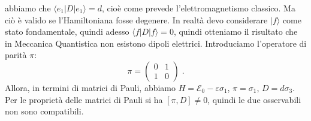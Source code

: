 \documentclass[10pt,a4paper]{report}
\theoremstyle{definition}
\numberwithin{equation}{section}
\newcommand{\bra}{\langle}
\newcommand{\ket}{\rangle}
\begin{document}
abbiamo che $\bra e_1|D|e_1\ket=d$, cioè come prevede l'elettromagnetismo classico. Ma ciò è valido se l'Hamiltoniana fosse degenere. In realtà devo considerare $|f\ket$ come stato fondamentale, quindi adesso $\bra f|D|f\ket=0$, quindi otteniamo il risultato che in Meccanica Quantistica non esistono dipoli elettrici. Introduciamo l'operatore di parità $\pi$:
\begin{equation}
\pi=\left(
\begin{matrix}
0 & 1 \\
1 & 0
\end{matrix}\right)\;.
\end{equation}
Allora, in termini di matrici di Pauli, abbiamo $H=\mathcal{E}_0-\varepsilon\sigma_1$, $\pi=\sigma_1$, $D=d\sigma_3$. Per le proprietà delle matrici di Pauli si ha $[\pi,D]\ne 0$, quindi le due osservabili non sono compatibili.
\end{document}
